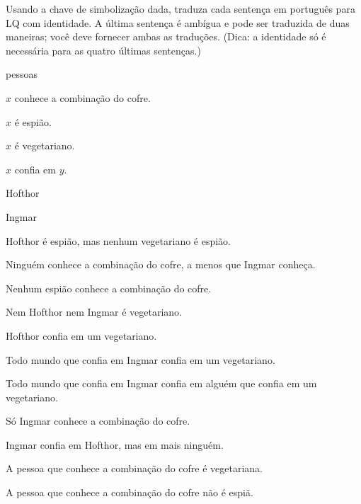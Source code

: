 \problempart
Usando a chave de simbolização dada, traduza cada sentença em português para LQ com identidade. A última sentença é ambígua e pode ser traduzida de duas maneiras; você deve fornecer ambas as traduções. (Dica: a identidade só é necessária para as quatro últimas sentenças.)
\begin{ekey}
\item[UD:] pessoas
\item[Kx:] $x$ conhece a combinação do cofre.
\item[Sx:] $x$ é espião.
\item[Vx:] $x$ é vegetariano.
\item[Txy:] $x$ confia em $y$.
\item[h:] Hofthor
\item[i:] Ingmar
\end{ekey}
\begin{earg}
\item Hofthor é espião, mas nenhum vegetariano é espião.
\item Ninguém conhece a combinação do cofre, a menos que Ingmar conheça.
\item Nenhum espião conhece a combinação do cofre.
\item Nem Hofthor nem Ingmar é vegetariano.
\item Hofthor confia em um vegetariano.
\item Todo mundo que confia em Ingmar confia em um vegetariano.
\item Todo mundo que confia em Ingmar confia em alguém que confia em um vegetariano.
\item Só Ingmar conhece a combinação do cofre.
\item Ingmar confia em Hofthor, mas em mais ninguém.
\item A pessoa que conhece a combinação do cofre é vegetariana.
\item A pessoa que conhece a combinação do cofre não é espiã.
\end{earg}

